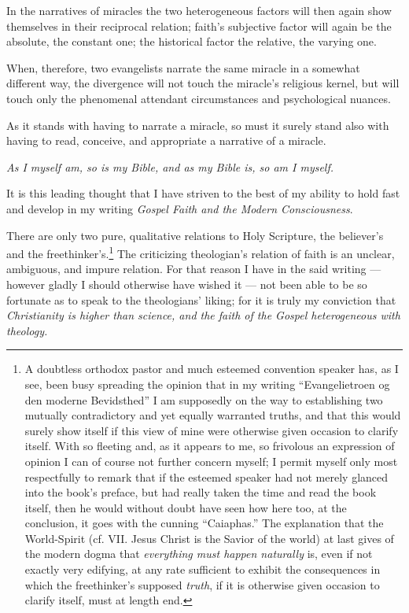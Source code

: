 \documentclass[12pt,a4paper]{book}
\begin{document}
In the narratives of miracles the two heterogeneous factors will then again show
themselves in their reciprocal relation; faith's subjective factor will again be
the absolute, the constant one; the historical factor the relative, the varying one.

When, therefore, two evangelists narrate the same miracle in a somewhat different
way, the divergence will not touch the miracle's religious kernel, but will touch
only the phenomenal attendant circumstances and psychological nuances.

As it stands with having to narrate a miracle,
so must it surely stand also with having to read, conceive, and appropriate a
narrative of a miracle.

\emph{As I myself am, so is my Bible, and as my Bible is, so am I myself.}

It is this leading thought that I have striven to the best of my ability to hold
fast and develop in my writing \emph{Gospel Faith and the Modern Consciousness}.

There are only two pure, qualitative relations to Holy Scripture, the believer's
and the freethinker's.\footnote{A doubtless orthodox pastor and much esteemed
convention speaker has, as I see, been busy spreading the opinion that in my
writing ``Evangelietroen og den moderne Bevidsthed'' I am supposedly on the way to
establishing two mutually contradictory and yet equally warranted truths, and that
this would surely show itself if this view of mine were otherwise given occasion to
clarify itself. With so fleeting and, as it appears to me, so frivolous an
expression of opinion I can of course not further concern myself; I permit myself
only most respectfully to remark that if the esteemed speaker had not merely glanced
into the book's preface, but had really taken the time and read the book itself,
then he would without doubt have seen how here too, at the conclusion, it goes with
the cunning ``Caiaphas.'' The explanation that the World-Spirit (cf. VII. Jesus
Christ is the Savior of the world) at last gives of the modern dogma that
\emph{everything must happen naturally} is, even if not exactly very edifying, at
any rate sufficient to exhibit the consequences in which the freethinker's supposed
\emph{truth}, if it is otherwise given occasion to clarify itself, must at length
end.} The criticizing theologian's relation of faith is an unclear, ambiguous, and
impure relation. For that reason I have in the said writing --- however gladly I
should otherwise have wished it --- not been able to be so fortunate as to speak to
the theologians' liking; for it is truly my conviction that \emph{Christianity is
higher than science, and the faith of the Gospel heterogeneous with theology.}
\end{document}
